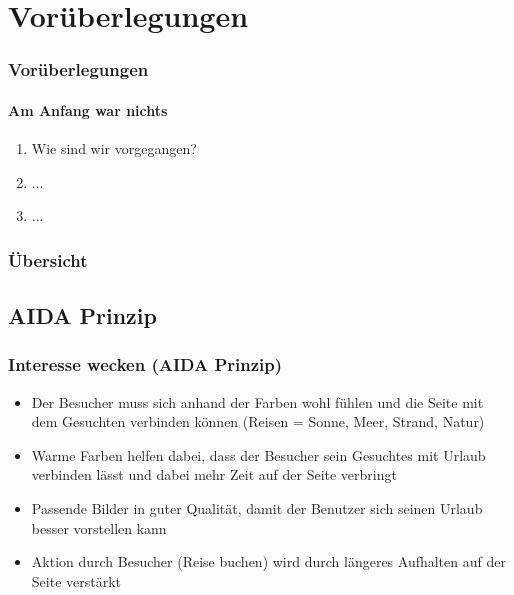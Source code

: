 \documentclass[xcolor=dvipsnames]{beamer}
\begin{document}
\section{Vorüberlegungen}
\begin{frame} %
  \frametitle{Vorüberlegungen} %
  \framesubtitle{Am Anfang war nichts} %
  \begin{block}{}
	  \begin{enumerate}
	  	\item Wie sind wir vorgegangen?
	  	\item ...
	  	\item ...
	  \end{enumerate}
  \end{block}
\end{frame}

\begin{frame} %
  \frametitle{Übersicht} %
\end{frame}



\subsection{AIDA Prinzip}
\begin{frame} %
  \frametitle{Interesse wecken (AIDA Prinzip)} %
  \begin{block}{}
	\begin{itemize}
		\item Der Besucher muss sich anhand der Farben wohl fühlen und die Seite mit dem Gesuchten verbinden können (Reisen = Sonne, Meer, Strand, Natur)
		\item Warme Farben helfen dabei, dass der Besucher sein Gesuchtes mit Urlaub verbinden lässt und dabei mehr Zeit auf der Seite verbringt
		\item Passende Bilder in guter Qualität, damit der Benutzer sich seinen Urlaub besser vorstellen kann
		\item Aktion durch Besucher (Reise buchen) wird durch längeres Aufhalten auf der Seite verstärkt
	\end{itemize}
  \end{block}
\end{frame}
\end{document}

